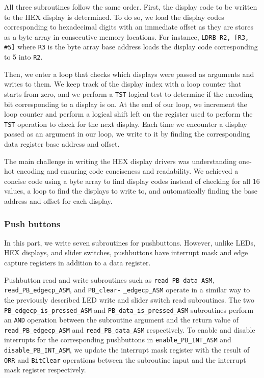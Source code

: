 \documentclass[10pt]{article}
\begin{document}
All three subroutines follow the same order. First, the display code to be written to the HEX display is determined. To do so, we load the display codes corresponding to hexadecimal digits with an immediate offset as they are stores as a byte array in consecutive memory locations. For instance, \verb+LDRB R2, [R3, #5]+ where \verb+R3+ is the byte array base address loads the display code corresponding to 5 into \verb+R2+.

Then, we enter a loop that checks which displays were passed as arguments and writes to them. We keep track of the display index with a loop counter that starts from zero, and we perform a \verb+TST+ logical test to determine if the encoding bit corresponding to a display is on. At the end of our loop, we increment the loop counter and perform a logical shift left on the register used to perform the \verb+TST+ operation to check for the next display. Each time we encounter a display passed as an argument in our loop, we write to it by finding the corresponding data register base address and offset.

The main challenge in writing the HEX display drivers was understanding one-hot encoding and ensuring code conciseness and readability. We achieved a concise code using a byte array to find display codes instead of checking for all 16 values, a loop to find the displays to write to, and automatically finding the base address and offset for each display.
\subsubsection*{Push buttons}
In this part, we write seven subroutines for pushbuttons. However, unlike LEDs, HEX displays, and slider switches, pushbuttons have interrupt mask and edge capture registers in addition to a data register.

Pushbutton read and write subroutines such as \verb+read_PB_data_ASM+, \verb+read_PB_edgecp_ASM+, and \verb+PB_clear-+ \verb+_edgecp_ASM+ operate in a similar way to the previously described LED write and slider switch read subroutines. The two \verb+PB_edgecp_is_pressed_ASM+ and \verb+PB_data_is_pressed_ASM+ subroutines perform an \verb+AND+ operation between the subroutine argument and the return value of \verb+read_PB_edgecp_ASM+ and \verb+read_PB_data_ASM+ respectively. To enable and disable interrupts for the corresponding pushbuttons in \verb+enable_PB_INT_ASM+ and \verb+disable_PB_INT_ASM+, we update the interrupt mask register with the result of \verb+ORR+ and \verb+BitClear+ operations between the subroutine input and the interrupt mask register respectively.
\end{document}
